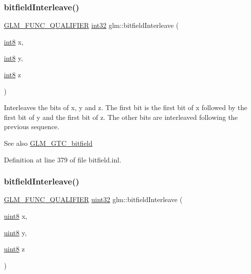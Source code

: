 \subsubsection{\texorpdfstring{bitfieldInterleave()}{bitfieldInterleave()}\hspace{0.1cm}{\footnotesize\ttfamily [7/16]}}
{\footnotesize\ttfamily \mbox{\hyperlink{setup_8hpp_a33fdea6f91c5f834105f7415e2a64407}{G\+L\+M\+\_\+\+F\+U\+N\+C\+\_\+\+Q\+U\+A\+L\+I\+F\+I\+ER}} \mbox{\hyperlink{group__gtc__type__precision_ga632d8b25f6b61659f39ea4321fab92a4}{int32}} glm\+::bitfield\+Interleave (\begin{DoxyParamCaption}\item[{\mbox{\hyperlink{group__gtc__type__precision_ga96254f9c1c4506fc8eb5cf3301ce8565}{int8}}}]{x,  }\item[{\mbox{\hyperlink{group__gtc__type__precision_ga96254f9c1c4506fc8eb5cf3301ce8565}{int8}}}]{y,  }\item[{\mbox{\hyperlink{group__gtc__type__precision_ga96254f9c1c4506fc8eb5cf3301ce8565}{int8}}}]{z }\end{DoxyParamCaption})}

Interleaves the bits of x, y and z. The first bit is the first bit of x followed by the first bit of y and the first bit of z. The other bits are interleaved following the previous sequence.

\begin{DoxySeeAlso}{See also}
\mbox{\hyperlink{group__gtc__bitfield}{G\+L\+M\+\_\+\+G\+T\+C\+\_\+bitfield}} 
\end{DoxySeeAlso}


Definition at line 379 of file bitfield.\+inl.

\mbox{\label{group__gtc__bitfield_gab9d593a2e916beb8f8137a0dbeae3afe}} 
\subsubsection{\texorpdfstring{bitfieldInterleave()}{bitfieldInterleave()}\hspace{0.1cm}{\footnotesize\ttfamily [8/16]}}
{\footnotesize\ttfamily \mbox{\hyperlink{setup_8hpp_a33fdea6f91c5f834105f7415e2a64407}{G\+L\+M\+\_\+\+F\+U\+N\+C\+\_\+\+Q\+U\+A\+L\+I\+F\+I\+ER}} \mbox{\hyperlink{group__gtc__type__precision_ga202b6a53c105fcb7e531f9b443518451}{uint32}} glm\+::bitfield\+Interleave (\begin{DoxyParamCaption}\item[{\mbox{\hyperlink{group__gtc__type__precision_ga1a7dcd8aac97cc8020817c94049deff2}{uint8}}}]{x,  }\item[{\mbox{\hyperlink{group__gtc__type__precision_ga1a7dcd8aac97cc8020817c94049deff2}{uint8}}}]{y,  }\item[{\mbox{\hyperlink{group__gtc__type__precision_ga1a7dcd8aac97cc8020817c94049deff2}{uint8}}}]{z }\end{DoxyParamCaption})}

